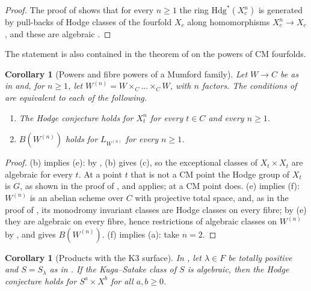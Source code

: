 \documentclass[11pt,reqno]{amsart}
\theoremstyle{plain}
\newtheorem{corollary}[theorem]{Corollary}
\theoremstyle{definition}
\theoremstyle{remark}
\newcommand{\Hdg}{\mathrm{Hdg}}
\begin{document}
\begin{proof}
The proof of  shows that for every $n\ge1$ the ring
$\Hdg^{*}(X_{c}^{n})$ is generated by pull-backs of Hodge classes of the
fourfold $X_{c}$ along homomorphisms $X_{c}^{n}\to X_{c}$, and these are
algebraic \cite{Mar25a}.
\end{proof}

The statement is also contained in the theorem of \cite{Li26} on the
powers of CM fourfolds.

\begin{corollary}[Powers and fibre powers of a Mumford family]
\label{cor:mumfordpowersequiv}
Let $W\to C$ be as in  and, for $n\ge1$, let
$W^{(n)}=W\times_{C}\dots\times_{C}W$, with $n$ factors. The conditions of
 are equivalent to each of the following.
\begin{enumerate}[label=\textup{(\alph*)},start=5,leftmargin=2.6em,itemsep=2pt]
\item The Hodge conjecture holds for $X_{t}^{n}$ for every $t\in C$ and
  every $n\ge1$.
\item $B(W^{(n)})$ holds for $L_{W^{(n)}}$ for every $n\ge1$.
\end{enumerate}
\end{corollary}

\begin{proof}
(b) implies (e): by , (b) gives (c), so the
exceptional classes of $X_{t}\times X_{t}$ are algebraic for every $t$. At a
point $t$ that is not a CM point the Hodge group of $X_{t}$ is $G$, as shown
in the proof of , and 
applies; at a CM point  does. (e) implies (f):
$W^{(n)}$ is an abelian scheme over $C$ with projective total space, and, as
in the proof of , its monodromy invariant classes are
Hodge classes on every fibre; by (e) they are algebraic on every fibre, hence
restrictions of algebraic classes on $W^{(n)}$ by , and
 gives $B(W^{(n)})$. (f) implies (a): take $n=2$.
\end{proof}

\begin{corollary}[Products with the K3 surface]\label{cor:mumfordksproducts}
In , let $\lambda\in F$ be totally positive and
$S=S_{\lambda}$ as in . If the Kuga--Satake class of $S$
is algebraic, then the Hodge conjecture holds for $S^{a}\times X^{b}$ for all
$a,b\ge0$.
\end{corollary}
\end{document}
